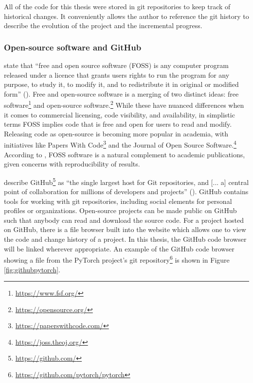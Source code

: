 \documentclass[report.tex]{subfiles}
\begin{document}
All of the code for this thesis were stored in git repositories to keep track of historical changes. It conveniently allows the author to reference the git history to describe the evolution of the project and the incremental progress.

\newpagefill

\subsubsection{Open-source software and GitHub}

\citeauthor{floss} state that ``free and open source software (FOSS) is any computer program released under a licence that grants users rights to run the program for any purpose, to study it, to modify it, and to redistribute it in original or modified form'' (\cite[1]{floss}). Free and open-source software is a merging of two distinct ideas: free software\footnote{\url{https://www.fsf.org/}} and open-source software.\footnote{\url{https://opensource.org/}} While these have nuanced differences when it comes to commercial licensing, code visibility, and availability, in simplistic terms FOSS implies code that is free and open for users to read and modify. Releasing code as open-source is becoming more popular in academia, with initiatives like Papers With Code\footnote{\url{https://paperswithcode.com/}} and the Journal of Open Source Software.\footnote{\url{https://joss.theoj.org/}} According to \textcite{floss}, FOSS software is a natural complement to academic publications, given concerns with reproducibility of results.

\citeauthor{gitbook} describe GitHub\footnote{\url{https://github.com/}} as ``the single largest host for Git repositories, and [... a] central point of collaboration for millions of developers and projects'' (\cite[131]{gitbook}). GitHub contains tools for working with git repositories, including social elements for personal profiles or organizations. Open-source projects can be made public on GitHub such that anybody can read and download the source code. For a project hosted on GitHub, there is a file browser built into the website which allows one to view the code and change history of a project. In this thesis, the GitHub code browser will be linked wherever appropriate. An example of the GitHub code browser showing a file from the PyTorch project's git repository\footnote{\url{https://github.com/pytorch/pytorch}} is shown in Figure \ref{fig:githubpytorch}.
\end{document}
